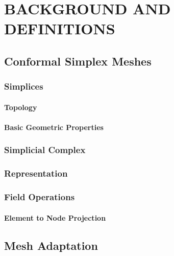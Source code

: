 
\chapter{BACKGROUND AND DEFINITIONS}
\label{chap:back}

\section{Conformal Simplex Meshes}

\subsection{Simplices}

\subsubsection{Topology}

\subsubsection{Basic Geometric Properties}

\subsection{Simplicial Complex}

\subsection{Representation}

\subsection{Field Operations}

\subsubsection{Element to Node Projection}

\section{Mesh Adaptation}

